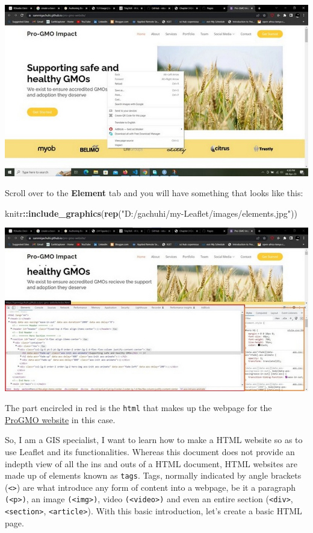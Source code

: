 \documentclass[
]{book}
\newenvironment{Shaded}{\begin{snugshade}}{\end{snugshade}}
\newcommand{\FunctionTok}[1]{\textcolor[rgb]{0.13,0.29,0.53}{\textbf{#1}}}
\newcommand{\NormalTok}[1]{#1}
\newcommand{\SpecialCharTok}[1]{\textcolor[rgb]{0.81,0.36,0.00}{\textbf{#1}}}
\newcommand{\StringTok}[1]{\textcolor[rgb]{0.31,0.60,0.02}{#1}}
\begin{document}
\includegraphics{../images/inspect.jpg}

Scroll over to the \textbf{Element} tab and you will have something that looks like this:

\begin{Shaded}
\begin{Highlighting}[]
\NormalTok{knitr}\SpecialCharTok{::}\FunctionTok{include\_graphics}\NormalTok{(}\FunctionTok{rep}\NormalTok{(}\StringTok{"D:/gachuhi/my{-}Leaflet/images/elements.jpg"}\NormalTok{))}
\end{Highlighting}
\end{Shaded}

\includegraphics{../images/elements.jpg}

The part encircled in red is the \texttt{html} that makes up the webpage for the \href{https://sammigachuhi.github.io/pro-gmo-website/}{ProGMO website} in this case.

So, I am a GIS specialist, I want to learn how to make a HTML website so as to use Leaflet and its functionalities. Whereas this document does not provide an indepth view of all the ins and outs of a HTML document, HTML websites are made up of elements known as \texttt{tags}. Tags, normally indicated by angle brackets (\texttt{\textless{}\textgreater{}}) are what introduce any form of content into a webpage, be it a paragraph \texttt{(\textless{}p\textgreater{})}, an image \texttt{(\textless{}img\textgreater{})}, video \texttt{(\textless{}video\textgreater{})} and even an entire section (\texttt{\textless{}div\textgreater{}}, \texttt{\textless{}section\textgreater{}}, \texttt{\textless{}article\textgreater{}}). With this basic introduction, let's create a basic HTML page.
\end{document}
